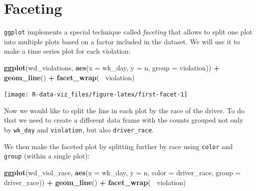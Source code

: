 \documentclass[]{book}
\newenvironment{Shaded}{\begin{snugshade}}{\end{snugshade}}
\newcommand{\KeywordTok}[1]{\textcolor[rgb]{0.13,0.29,0.53}{\textbf{#1}}}
\newcommand{\DataTypeTok}[1]{\textcolor[rgb]{0.13,0.29,0.53}{#1}}
\newcommand{\StringTok}[1]{\textcolor[rgb]{0.31,0.60,0.02}{#1}}
\newcommand{\OperatorTok}[1]{\textcolor[rgb]{0.81,0.36,0.00}{\textbf{#1}}}
\newcommand{\NormalTok}[1]{#1}
\theoremstyle{definition}
\theoremstyle{definition}
\theoremstyle{definition}
\theoremstyle{remark}
\begin{document}
\section{Faceting}\label{faceting}

\texttt{ggplot} implements a special technique called \emph{faceting}
that allows to split one plot into multiple plots based on a factor
included in the dataset. We will use it to make a time series plot for
each violation:

\begin{Shaded}
\begin{Highlighting}[]
\KeywordTok{ggplot}\NormalTok{(wd_violations, }\KeywordTok{aes}\NormalTok{(}\DataTypeTok{x =}\NormalTok{ wk_day, }\DataTypeTok{y =}\NormalTok{ n, }\DataTypeTok{group =}\NormalTok{ violation)) }\OperatorTok{+}
\StringTok{     }\KeywordTok{geom_line}\NormalTok{() }\OperatorTok{+}
\StringTok{     }\KeywordTok{facet_wrap}\NormalTok{(}\OperatorTok{~}\StringTok{ }\NormalTok{violation)}
\end{Highlighting}
\end{Shaded}

\texttt{[image: R-data-viz\_files/figure-latex/first-facet-1]}

Now we would like to split the line in each plot by the race of the
driver. To do that we need to create a different data frame with the
counts grouped not only by \texttt{wk\_day} and \texttt{violation}, but
also \texttt{driver\_race}.

\begin{Shaded}
\end{Shaded}

We then make the faceted plot by splitting further by race using
\texttt{color} and \texttt{group} (within a single plot):

\begin{Shaded}
\begin{Highlighting}[]
\KeywordTok{ggplot}\NormalTok{(wd_viol_race, }\KeywordTok{aes}\NormalTok{(}\DataTypeTok{x =}\NormalTok{ wk_day, }\DataTypeTok{y =}\NormalTok{ n, }\DataTypeTok{color =}\NormalTok{ driver_race, }\DataTypeTok{group =}\NormalTok{ driver_race)) }\OperatorTok{+}
\StringTok{  }\KeywordTok{geom_line}\NormalTok{() }\OperatorTok{+}\StringTok{ }
\StringTok{  }\KeywordTok{facet_wrap}\NormalTok{(}\OperatorTok{~}\StringTok{ }\NormalTok{violation)}
\end{Highlighting}
\end{Shaded}
\end{document}
